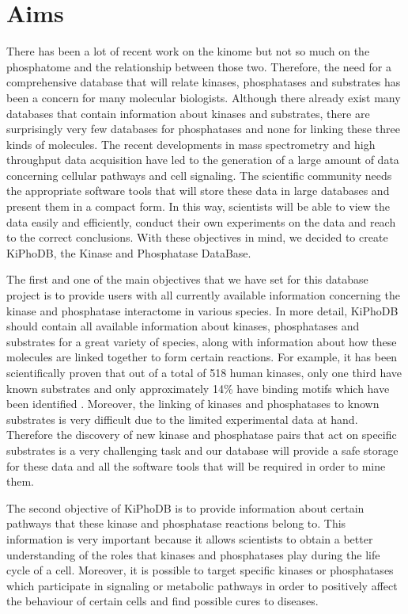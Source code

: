 \section{Aims}
There has been a lot of recent work on the kinome\cite{kinome} but not so much on the phosphatome and the relationship between those two.
Therefore, the need for a comprehensive database that will relate kinases, phosphatases and substrates has been a concern for many molecular biologists.
Although there already exist many databases that contain information about kinases and substrates, there are surprisingly very few databases for phosphatases
and none for linking these three kinds of molecules.
The recent developments in mass spectrometry and high throughput data acquisition have led to the generation of a large amount of data concerning cellular pathways
and cell signaling.
The scientific community needs the appropriate software tools that will store these data in large databases and present them in a compact form.
In this way, scientists will be able to view the data easily and efficiently, conduct their own experiments on the data and reach to the correct conclusions.
With these objectives in mind, we decided to create KiPhoDB, the Kinase and Phosphatase DataBase.

The first and one of the main objectives that we have set for this database project is to provide users with all currently available information concerning the kinase and phosphatase interactome in various species.
In more detail, KiPhoDB should contain all available information about kinases, phosphatases and substrates for a great variety of species,
along with information about how these molecules are linked together to form certain reactions.
For example, it has been scientifically proven that out of a total of 518 human kinases, only one third have known substrates and only approximately 14\% have binding motifs which have been identified \cite{PhosphoPoint}.
Moreover, the linking of kinases and phosphatases to known substrates is very difficult due to the limited experimental data at hand.
Therefore the discovery of new kinase and phosphatase pairs that act on specific substrates is a very challenging task and our database will provide a safe storage for these data and all the software tools that will be required in order to mine them.

The second objective of KiPhoDB is to provide information about certain pathways that these kinase and phosphatase reactions belong to.
This information is very important because it allows scientists to obtain a better understanding of the roles that kinases and
phosphatases play during the life cycle of a cell.
Moreover, it is possible to target specific kinases or phosphatases which participate in signaling or metabolic pathways in order to positively
affect the behaviour of certain cells and find possible cures to diseases.

